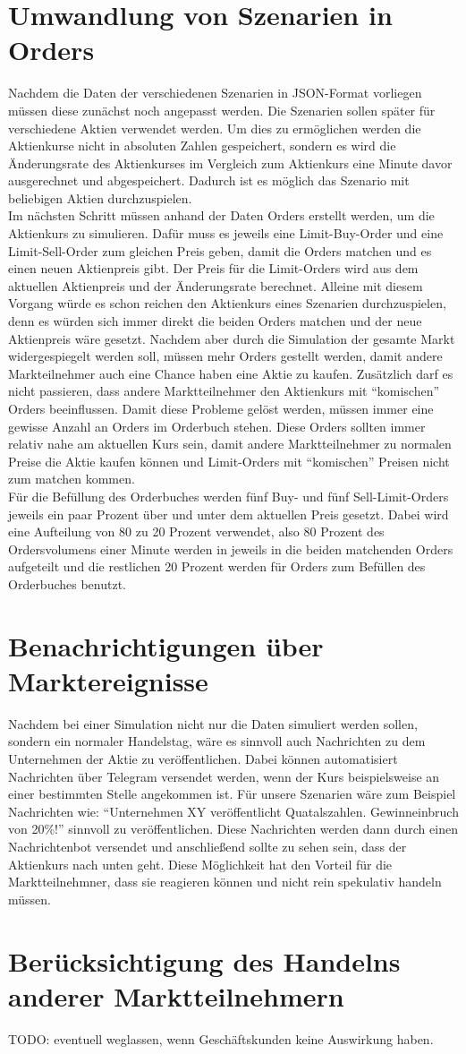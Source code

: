\section{Umwandlung von Szenarien in Orders}
Nachdem die Daten der verschiedenen Szenarien in JSON-Format vorliegen müssen diese zunächst noch angepasst werden. Die 
Szenarien sollen später für verschiedene Aktien verwendet werden. Um dies zu ermöglichen werden die Aktienkurse nicht in 
absoluten Zahlen gespeichert, sondern es wird die Änderungsrate des Aktienkurses im Vergleich zum Aktienkurs eine Minute davor 
ausgerechnet und abgespeichert. Dadurch ist es möglich das Szenario mit beliebigen Aktien durchzuspielen. \\
Im nächsten Schritt müssen anhand der Daten Orders erstellt werden, um die Aktienkurs zu simulieren. Dafür muss es jeweils eine Limit-Buy-Order 
und eine Limit-Sell-Order zum gleichen Preis geben, damit die Orders matchen und es einen neuen Aktienpreis gibt. Der Preis für die 
Limit-Orders wird aus dem aktuellen Aktienpreis und der Änderungsrate berechnet. Alleine mit diesem Vorgang würde es schon reichen 
den Aktienkurs eines Szenarien durchzuspielen, denn es würden sich immer direkt die beiden Orders matchen und der neue Aktienpreis 
wäre gesetzt. Nachdem aber durch die Simulation der gesamte Markt widergespiegelt werden soll, müssen mehr Orders gestellt werden, damit 
andere Markteilnehmer auch eine Chance haben eine Aktie zu kaufen. Zusätzlich darf es nicht passieren, dass andere Marktteilnehmer 
den Aktienkurs mit \enquote{komischen} Orders beeinflussen. Damit diese Probleme gelöst werden, müssen immer eine gewisse Anzahl an Orders 
im Orderbuch stehen. Diese Orders sollten immer relativ nahe am aktuellen Kurs sein, damit andere Marktteilnehmer zu normalen Preise die 
Aktie kaufen können und Limit-Orders mit \enquote{komischen} Preisen nicht zum matchen kommen. \\
Für die Befüllung des Orderbuches werden fünf Buy- und fünf Sell-Limit-Orders jeweils ein paar Prozent über und unter dem aktuellen 
Preis gesetzt. Dabei wird eine Aufteilung von 80 zu 20 Prozent verwendet, also 80 Prozent des Ordersvolumens einer Minute werden in jeweils 
in die beiden matchenden Orders aufgeteilt und die restlichen 20 Prozent werden für Orders zum Befüllen des Orderbuches benutzt.
\section{Benachrichtigungen über Marktereignisse}
Nachdem bei einer Simulation nicht nur die Daten simuliert werden sollen, sondern ein normaler Handelstag, wäre es sinnvoll auch Nachrichten 
zu dem Unternehmen der Aktie zu veröffentlichen. Dabei können automatisiert Nachrichten über Telegram versendet werden, wenn der Kurs beispielsweise 
an einer bestimmten Stelle angekommen ist. Für unsere Szenarien wäre zum Beispiel Nachrichten wie: \enquote{Unternehmen XY veröffentlicht Quatalszahlen. 
Gewinneinbruch von 20\%!} sinnvoll zu veröffentlichen. Diese Nachrichten werden dann durch einen Nachrichtenbot versendet und anschließend sollte zu 
sehen sein, dass der Aktienkurs nach unten geht. Diese Möglichkeit hat den Vorteil für die Marktteilnehmner, dass sie reagieren können und nicht 
rein spekulativ handeln müssen.
\section{Berücksichtigung des Handelns anderer Marktteilnehmern}
TODO: eventuell weglassen, wenn Geschäftskunden keine Auswirkung haben.